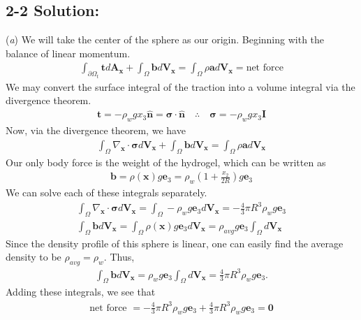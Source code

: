 \subsection*{\textbf{2-2 Solution:}}
(\textit{a}) We will take the center of the sphere as our origin. Beginning with the balance of linear momentum.
\begin{gather*}
    \int_{\partial\Omega_t}\bm{t}d\bm{A_x}+\int_\Omega\bm{b}d\bm{V_x}=\int_\Omega\rho\bm{a}d\bm{V_x}=\text{net force}
\end{gather*}
We may convert the surface integral of the traction into a volume integral via the divergence theorem.
\begin{gather*}
    \bm{t}=-\rho_wgx_3\hat{\bm{n}}=\bm{\sigma}\cdot\hat{\bm{n}}\quad\therefore\quad\bm{\sigma}=-\rho_w gx_3 \bm{I}
\end{gather*}
Now, via the divergence theorem, we have
\begin{gather*}
    \int_\Omega\nabla_{\bm{x}}\cdot\bm{\sigma}d\bm{V_x}+\int_\Omega\bm{b}d\bm{V_x}=\int_\Omega\rho\bm{a}d\bm{V_x}
\end{gather*}
Our only body force is the weight of the hydrogel, which can be written as
\begin{gather*}
    \bm{b}=\rho(\bm{x})g\bm{e}_3=\rho_w(1+\frac{x_2}{2R})g\bm{e}_3
\end{gather*}
We can solve each of these integrals separately.
\begin{gather*}
    \int_\Omega\nabla_{\bm{x}}\cdot\bm{\sigma}d\bm{V_x}= \int_{\Omega}-\rho_w g \bm{e}_3d\bm{V_x}=-\frac{4}{3}\pi R^3\rho_wg\bm{e}_3\\
    \int_\Omega\bm{b}d\bm{V_x}=\int_{\Omega}\rho(\bm{x})g\bm{e}_3d\bm{V_x}=\rho_{avg}g\bm{e}_3\int_{\Omega} d\bm{V_x}
\end{gather*}
Since the density profile of this sphere is linear, one can easily find the average density to be $\rho_{avg}=\rho_w$. Thus,
\begin{gather*}
    \int_\Omega\bm{b}d\bm{V_x}=\rho_w g \bm{e}_3\int_{\Omega}d\bm{V_x}=\frac{4}{3}\pi R^3\rho_wg\bm{e}_3.
\end{gather*}
Adding these integrals, we see that
\begin{gather*}
    \text{net force }=-\frac{4}{3}\pi R^3\rho_wg\bm{e}_3+\frac{4}{3}\pi R^3\rho_wg\bm{e}_3=\bm{0}
\end{gather*}

